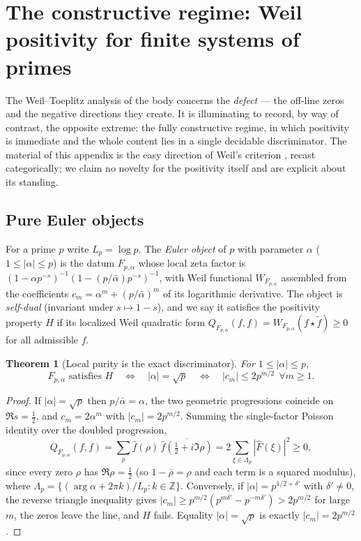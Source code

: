 \documentclass[11pt,reqno]{amsart}
\newtheorem{theorem}{Theorem}[section]
\theoremstyle{definition}
\newcommand{\half}{\tfrac12}
\begin{document}
\appendix
\section{The constructive regime: Weil positivity for finite systems of primes}
\label{app:constructive}

The Weil--Toeplitz analysis of the body concerns the \emph{defect} --- the off-line
zeros and the negative directions they create. It is illuminating to record, by way
of contrast, the opposite extreme: the fully constructive regime, in which positivity
is immediate and the whole content lies in a single decidable discriminator. The
material of this appendix is the easy direction of Weil's criterion \cite{Weil1952},
recast categorically; we claim no novelty for the positivity itself and are explicit
about its standing.

\subsection{Pure Euler objects}
For a prime $p$ write $L_p=\log p$. The \emph{Euler object} of $p$ with parameter
$\alpha$ ($1\le|\alpha|\le p$) is the datum $F_{p,\alpha}$ whose local zeta factor is
$(1-\alpha p^{-s})^{-1}(1-(p/\bar\alpha)p^{-s})^{-1}$, with Weil functional
$W_{F_{p,\alpha}}$ assembled from the coefficients $c_m=\alpha^m+(p/\bar\alpha)^m$ of
its logarithmic derivative. The object is \emph{self-dual} (invariant under
$s\mapsto1-s$), and we say it satisfies the positivity property $H$ if its localized
Weil quadratic form $Q_{F_{p,\alpha}}(f,f)=W_{F_{p,\alpha}}(f\star\tilde f)\ge0$ for all
admissible $f$.

\begin{theorem}[Local purity is the exact discriminator]\label{thm:local-purity}
For $1\le|\alpha|\le p$,
\[
F_{p,\alpha}\text{ satisfies }H\quad\Longleftrightarrow\quad|\alpha|=\sqrt p
\quad\Longleftrightarrow\quad|c_m|\le2p^{m/2}\ \ \forall m\ge1 .
\]
\end{theorem}
\begin{proof}
If $|\alpha|=\sqrt p$ then $p/\bar\alpha=\alpha$, the two geometric progressions
coincide on $\Re s=\half$, and $c_m=2\alpha^m$ with $|c_m|=2p^{m/2}$. Summing the
single-factor Poisson identity over the doubled progression,
\[
Q_{F_{p,\alpha}}(f,f)=\sum_{\rho}\widehat f(\rho)\,\overline{\widehat f(\half+i\Im\rho)}
=2\sum_{\xi\in\Lambda_p}|\widehat F(\xi)|^2\ge0,
\]
since every zero $\rho$ has $\Re\rho=\half$ (so $1-\bar\rho=\rho$ and each term is a
squared modulus), where $\Lambda_p=\{(\arg\alpha+2\pi k)/L_p:k\in\mathbb Z\}$.
Conversely, if $|\alpha|=p^{1/2+\delta'}$ with $\delta'\ne0$, the reverse triangle
inequality gives $|c_m|\ge p^{m/2}(p^{m\delta'}-p^{-m\delta'})>2p^{m/2}$ for large $m$,
the zeros leave the line, and $H$ fails. Equality $|\alpha|=\sqrt p$ is exactly
$|c_m|=2p^{m/2}$.
\end{proof}
\end{document}
